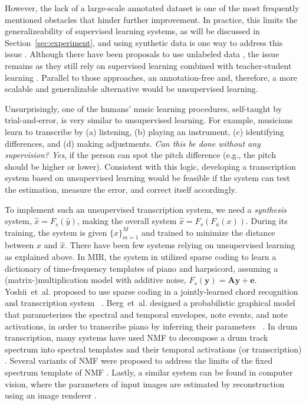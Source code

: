 \documentclass{article}
\begin{document}
	However, the lack of a large-scale annotated dataset is one of the most frequently mentioned obstacles that hinder further improvement. 
	In practice, this limits the generalizeability of supervised learning systems, as will be discussed in Section~\ref{sec:experiment}, and using synthetic data is one way to address this issue \cite{cartwright2018increasing, vogl2018towards}. Although there have been proposals to use unlabeled data \cite{wu2017automatic, wu2018labeled}, the issue remains as they still rely on supervised learning combined with teacher-student learning \cite{hinton2015distilling}. 
	Parallel to those approaches, an annotation-free and, therefore, a more scalable and generalizable alternative would be unsupervised learning. 
	
	Unsurprisingly, one of the humans' music learning procedures, self-taught by trial-and-error, is very similar to unsupervised learning. For example, musicians learn to transcribe by (a) listening, (b) playing an instrument, (c) identifying differences, and (d) making adjustments. \textit{Can this be done without any supervision?} \textit{Yes}, if the person can spot the pitch difference (e.g., the pitch should be higher or lower). Consistent with this logic, developing a transcription system based on unsupervised learning would be feasible if the system can test the estimation, measure the error, and correct itself accordingly.
	
	To implement such an unsupervised transcription system, we need a \textit{synthesis} system, $\hat{x}=F_s(\hat{y})$, making the overall system $\hat{x}=F_s(F_a(x))$. During its training, the system is given $\{x\}_{m=1}^M$ and trained to minimize the distance between $x$ and $\hat{x}$.
	There have been few systems relying on unsupervised learning as explained above.
	In MIR, the system in \cite{abdallah2006unsupervised} utilized sparse coding to learn a dictionary of time-frequency templates of piano and harpsicord, assuming a (matrix-)multiplication model with additive noise, $F_s(\mathbf{y})=\mathbf{Ay}+\mathbf{e}$. Yoshii~et~al. proposed to use sparse coding in a jointly-learned chord recognition and transcription system ~\cite{yoshii2012unsupervised}. Berg~et~al. designed a probabilistic graphical model that parameterizes the spectral and temporal envelopes, note events, and note activations, in order to transcribe piano by inferring their parameters ~\cite{berg2014unsupervised}.
	In drum transcription, many systems have used NMF to decompose a drum track spectrum into spectral templates and their temporal activations (or transcription) \cite{paulus2005drum, wu2015drum}. Several variants of NMF were proposed to address the limits of the fixed spectrum template of NMF \cite{roebel2015automatic, laroche2017drum, lindsay2012drumkit}.
	Lastly, a similar system can be found in computer vision, where the parameters of input images are estimated by reconstruction using an image renderer \cite{kanazawa2018learning}.
	
\end{document}
